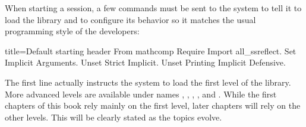 When starting a \Coq{} session, a few commands must be sent to the \Coq{}
system to tell it to load the \mcbMC{} library and to configure its behavior
so it matches the usual programming style of the \mcbMC{} developers:

\begin{coq}{}{title={Default starting header}}
From mathcomp Require Import all_ssreflect.
Set Implicit Arguments.
Unset Strict Implicit.
Unset Printing Implicit Defensive.
\end{coq}
The first line actually instructs the \Coq{} system to load the first level
of the \mcbMC{} library.  More advanced levels are available under names
, , , ,
and .  While the first chapters of this book
rely mainly on the first
level, later chapters will rely on the other levels.  This will be clearly
stated as the topics evolve.

